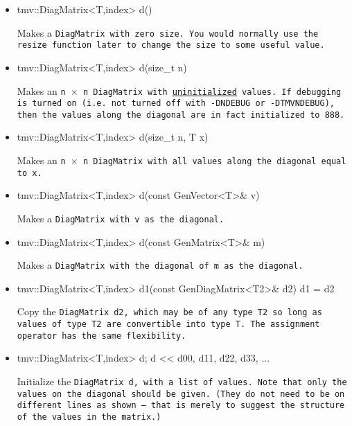 \begin{itemize}

\item
\begin{tmvcode}
tmv::DiagMatrix<T,index> d()
\end{tmvcode}
Makes a \tt{DiagMatrix} with zero size.  You would normally use the \tt{resize} function later to
change the size to some useful value.

\item 
\begin{tmvcode}
tmv::DiagMatrix<T,index> d(size_t n)
\end{tmvcode}
Makes an \tt{n} $\times$ \tt{n} \tt{DiagMatrix} with \underline{uninitialized} values.
If debugging is turned on (i.e. not turned off
with \tt{-DNDEBUG} or \tt{-DTMVNDEBUG}), then the values along the diagonal are in fact initialized to 888. 

\item
\begin{tmvcode}
tmv::DiagMatrix<T,index> d(size_t n, T x)
\end{tmvcode}
Makes an \tt{n} $\times$ \tt{n} \tt{DiagMatrix} with all values along the diagonal equal to \tt{x}.

\item
\begin{tmvcode}
tmv::DiagMatrix<T,index> d(const GenVector<T>& v)
\end{tmvcode}
Makes a \tt{DiagMatrix} with \tt{v} as the diagonal.

\item 
\begin{tmvcode}
tmv::DiagMatrix<T,index> d(const GenMatrix<T>& m)
\end{tmvcode}
Makes a \tt{DiagMatrix} with the diagonal of \tt{m} as the diagonal.

\item
\begin{tmvcode}
tmv::DiagMatrix<T,index> d1(const GenDiagMatrix<T2>& d2)
d1 = d2
\end{tmvcode}
Copy the \tt{DiagMatrix d2}, which may be of any type \tt{T2} so long
as values of type \tt{T2} are convertible into type \tt{T}.
The assignment operator has the same flexibility.

\item
\begin{tmvcode}
tmv::DiagMatrix<T,index> d;
d << d00,
         d11,
             d22,
                 d33, 
                     ...
\end{tmvcode}
Initialize the \tt{DiagMatrix d}, with a list of values.  Note that only the values on the diagonal should be given.  (They do not need to be on different lines as shown -- that is merely to suggest the structure of the values in the matrix.)


\end{itemize}
